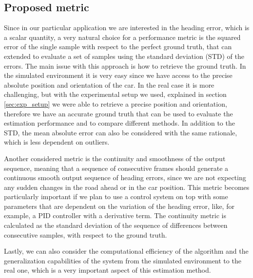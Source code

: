 \documentclass[a4paper,12pt,sort&compress]{article}
\begin{document}
    \subsection{Proposed metric}
    Since in our particular application we are interested in the heading error, which is a scalar
    quantity, a very natural choice for a performance metric is the squared error of the single sample with
    respect to the perfect ground truth, that can extended to evaluate a set of samples using the
    standard deviation (STD) of the errors. The main issue with this approach is how to retrieve the ground
    truth. In the simulated environment it is very easy since we have access to the precise absolute position
    and orientation of the car. In the real case it is more challenging, but with the experimental
    setup we used, explained in section \ref*{sec:exp_setup} we were able to retrieve a precise
    position and orientation, therefore we have an accurate ground truth that can be used to
    evaluate the estimation performance and to compare different methods. In addition to the STD,
    the mean absolute error can also be considered with the same rationale, which is less dependent
    on outliers. 

    Another considered metric is the continuity and smoothness of the output sequence,
    meaning that a sequence of consecutive frames should generate a continuous smooth output sequence
    of heading errors, since we are not expecting any sudden changes in the road ahead or in the car
    position. This metric becomes particularly important if we plan to use a control system on top
    with some parameters that are dependent on the variation of the heading error, like, for
    example, a PID controller with a derivative term. The continuity metric is calculated as the
    standard deviation of the sequence of differences between consecutive samples, with respect to
    the ground truth.    

    Lastly, we can also consider the computational efficiency of the algorithm and the
    generalization capabilities of the system from the simulated environment to the real one, which
    is a very important aspect of this estimation method.   
\end{document}
